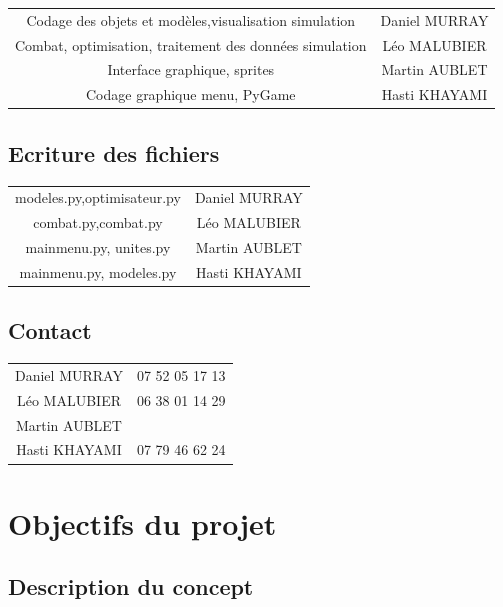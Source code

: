 \documentclass[a4paper, 11pt]{article}
\begin{document}
\begin{center}
\begin{tabular}{ |c|c| } 
 \hline
 Codage des objets et modèles,visualisation simulation & Daniel MURRAY \\ 
 Combat, optimisation, traitement des données simulation & Léo MALUBIER \\ 
 Interface graphique, sprites & Martin AUBLET \\
 Codage graphique menu, PyGame  & Hasti KHAYAMI  \\
 \hline
\end{tabular}
\end{center}

\subsection{Ecriture des fichiers}

\begin{center}
\begin{tabular}{ |c|c| } 
 \hline
 modeles.py,optimisateur.py & Daniel MURRAY \\ 
 combat.py,combat.py & Léo MALUBIER \\ 
 mainmenu.py, unites.py & Martin AUBLET \\
 mainmenu.py, modeles.py  & Hasti KHAYAMI  \\
 \hline
\end{tabular}
\end{center}

\subsection{Contact}

\begin{center}
\begin{tabular}{ |c|c| } 
 \hline
 Daniel MURRAY & 07 52 05 17 13 \\ 
 Léo MALUBIER & 06 38 01 14 29 \\ 
 Martin AUBLET & \\
  Hasti KHAYAMI & 07 79 46 62 24 \\
 \hline
\end{tabular}
\end{center}

\section{Objectifs du projet}

\subsection{Description du concept}
\end{document}
